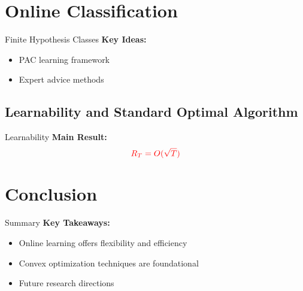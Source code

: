 \documentclass{beamer}
\begin{document}
\section{Online Classification}
\begin{frame}{Finite Hypothesis Classes}
    \textbf{Key Ideas:}
    \begin{itemize}
        \item PAC learning framework
        \item Expert advice methods
    \end{itemize}
\end{frame}

\subsection{Learnability and Standard Optimal Algorithm}
\begin{frame}{Learnability}
    \textbf{Main Result:}
    \begin{equation}
        \textcolor{red}{R_T = O(\sqrt{T})}
    \end{equation}
\end{frame}

\section{Conclusion}
\begin{frame}{Summary}
    \textbf{Key Takeaways:}
    \begin{itemize}
        \item Online learning offers flexibility and efficiency
        \item Convex optimization techniques are foundational
        \item Future research directions
    \end{itemize}
\end{frame}
\end{document}
